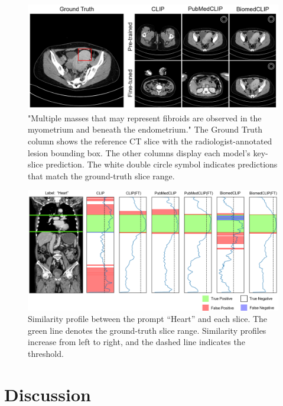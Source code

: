 \documentclass[bioengineering,article,submit,pdftex,moreauthors]{Definitions/mdpi}
\begin{document}
\begin{figure}[ht]
  \centering
  \includegraphics[width=1\textwidth]{./figures/figure2_4.png}
  \caption{"Multiple masses that may represent fibroids are observed in the myometrium and beneath the endometrium."
  The Ground Truth column shows the reference CT slice with the radiologist-annotated lesion bounding box.
  The other columns display each model’s key-slice prediction.
  The white double circle symbol indicates predictions that match the ground-truth slice range.
  }
  \label{fig:lesion_aware_results}
\end{figure}


\begin{figure}[ht]
  \centering
  \includegraphics[width=1\textwidth]{./figures/figure3_4.png}
  \caption{Similarity profile between the prompt “Heart” and each slice. 
  The green line denotes the ground-truth slice range. 
  Similarity profiles increase from left to right, and the dashed line indicates the threshold. 
  }
  \label{fig:organ_aware_results}
\end{figure}

\section{Discussion}
\end{document}
